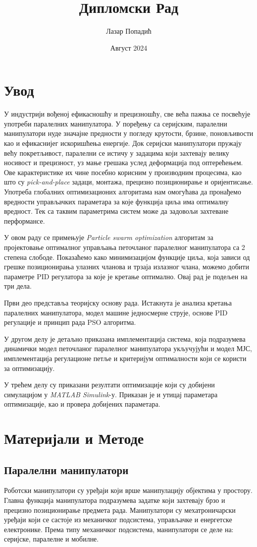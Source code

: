 \documentclass[12pt]{article}
\title{Дипломски Рад}
\author{Лазар Попадић}
\date{Август 2024}
\begin{document}
\tableofcontents
\newpage

\section{Увод}
У индустрији вођеној ефикасношћу и прецизношћу, све већа пажња се посвећује употреби паралелних манипулатора. У поређењу са серијским, паралелни манипулатори нуде значајне предности у погледу крутости, брзине, поновљивости као и ефикаснијег искоришћења енергије. Док серијски манипулатори пружају већу покретљивост, паралелни се истичу у задацима који захтевају велику носивост и прецизност, уз мање грешака услед деформација под оптерећењем. Ове карактеристике их чине посебно корисним у производним процесима, као што су \textit{pick-and-place} задаци, монтажа, прецизно позиционирање и оријентисање.
 Употреба глобалних оптимизационих алгоритама нам омогућава да пронађемо вредности управљачких параметара за које функција циља има оптималну вредност. Тек са таквим параметрима систем може да задовољи захтеване перформансе.

У овом раду се примењује \textit{Particle swarm optimization} алгоритам за пројектовање оптималног управљања петочланог паралелног манипулатора са 2 степена слободе. Показаћемо како минимизацијом функције циља, која зависи од грешке позиционирања улазних чланова и трзаја излазног члана, можемо добити параметре PID регулатора за које је кретање оптимално.
Овај рад је подељен на три дела.

Први део представља теоријску основу рада. Истакнута је анализа кретања паралелних манипулатора, модел машине једносмерне струје, основе PID регулације и принцип рада PSO алгоритма. 

У другом делу је детаљно приказана имплементација система, која подразумева динамички модел петочланог паралелног манипулатора укључујући и модел МЈС, имплементација регулационе петље и критеријум оптималности који се користи за оптимизацију. 

У трећем делу су приказани резултати оптимизације који су добијени симулацијом у \textit{MATLAB Simulink}-у. Приказан је и утицај параметара оптимизације, као и провера добијених параметара.

\newpage
\section{Материјали и Методе}

\subsection{Паралелни манипулатори}
Роботски манипулатори су уређаји који врше манипулацију објектима у простору. Главна функција манипулатора подразумева задатке који захтевају брзо и прецизно позиционирање предмета рада. Манипулатори су мехатроничарски уређаји који се састоје из механичког подсистема, управљачке и енергетске електронике. Према типу механичког подсистема, манипулатори се деле на: серијске, паралелне и мобилне.
\end{document}
